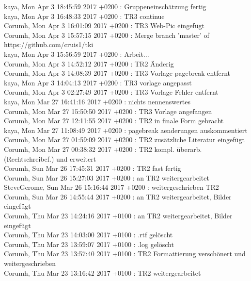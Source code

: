 kaya, Mon Apr 3 18:45:59 2017 +0200 : Gruppeneinschätzung fertig\\
kaya, Mon Apr 3 16:48:33 2017 +0200 : TR3 continue\\
Corumh, Mon Apr 3 16:01:09 2017 +0200 : TR3 Web-Pic eingefügt\\
Corumh, Mon Apr 3 15:57:15 2017 +0200 : Merge branch 'master' of https://github.com/cruis1/tki\\
kaya, Mon Apr 3 15:56:59 2017 +0200 : Arbeit...\\
Corumh, Mon Apr 3 14:52:12 2017 +0200 : TR2 Änderig\\
Corumh, Mon Apr 3 14:08:39 2017 +0200 : TR3 Vorlage pagebreak entfernt\\
kaya, Mon Apr 3 14:04:13 2017 +0200 : TR3 vorlage angepasst\\
Corumh, Mon Apr 3 02:27:49 2017 +0200 : TR3 Vorlage Fehler entfernt\\
kaya, Mon Mar 27 16:41:16 2017 +0200 : nichts nennenswertes\\
Corumh, Mon Mar 27 15:50:50 2017 +0200 : TR3 Vorlage angefangen\\
Corumh, Mon Mar 27 12:11:55 2017 +0200 : TR2 in finale Form gebracht\\
kaya, Mon Mar 27 11:08:49 2017 +0200 : pagebreak aenderungen auskommentiert\\
Corumh, Mon Mar 27 01:59:09 2017 +0200 : TR2 zusätzliche Literatur eingefügt\\
Corumh, Mon Mar 27 00:38:32 2017 +0200 : TR2 kompl. überarb. (Rechtschreibef.) und erweitert\\
Corumh, Sun Mar 26 17:45:31 2017 +0200 : TR2 fast fertig\\
Corumh, Sun Mar 26 15:27:03 2017 +0200 : an TR2 weitergearbeitet\\
SteveGerome, Sun Mar 26 15:16:44 2017 +0200 : weitergeschrieben TR2\\
Corumh, Sun Mar 26 14:55:44 2017 +0200 : an TR2 weitergearbeitet, Bilder eingefügt\\
Corumh, Thu Mar 23 14:24:16 2017 +0100 : an TR2 weitergearbeitet, Bilder eingefügt\\
Corumh, Thu Mar 23 14:03:00 2017 +0100 : .rtf gelöscht\\
Corumh, Thu Mar 23 13:59:07 2017 +0100 : .log gelöscht\\
Corumh, Thu Mar 23 13:57:40 2017 +0100 : TR2 Formattierung verschönert und weitergeschrieben\\
Corumh, Thu Mar 23 13:16:42 2017 +0100 : TR2 weitergearbeitet\\
